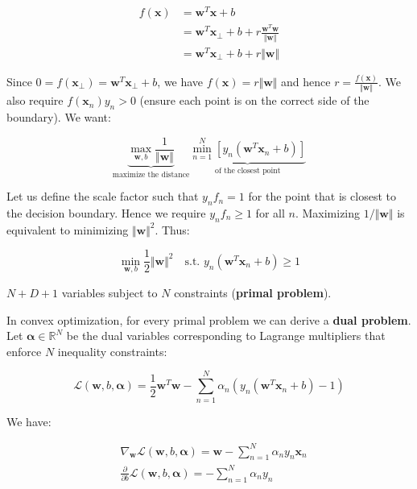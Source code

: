 \documentclass[10pt,landscape]{article}
\begin{document}
\begin{multicols}{3}
\begin{align*}
f(\mathbf{x}) & = \mathbf{w}^{T}\mathbf{x} + b \\
& = \mathbf{w}^{T}\mathbf{x}_{\bot}+b+r\frac{\mathbf{w}^{T}\mathbf{w}}{\Vert \mathbf{w} \Vert} \\
& = \mathbf{w}^{T}\mathbf{x}_{\bot}+b+r{\Vert \mathbf{w} \Vert}
\end{align*}

Since $0 = f(\mathbf{x}_{\bot}) = \mathbf{w}^{T}\mathbf{x}_{\bot}+b$, we have $f(\mathbf{x}) = r{\Vert \mathbf{w} \Vert}$ and hence $r=\frac{f(\mathbf{x})}{\Vert \mathbf{w} \Vert}$. We also require $f(\mathbf{x}_n)y_n > 0$ (ensure each point is on the correct side of the boundary). We want:

\begin{equation*}
\underbrace{\max_{\mathbf{w}, b} \frac{1}{\Vert \mathbf{w} \Vert}}_{\textrm{maximize the distance}} \underbrace{\min_{n=1}^{N} \left[ y_n\left( \mathbf{w}^{T}\mathbf{x}_n+b\right) \right]}_{\textrm{of the closest point}}
\end{equation*}

Let us define the scale factor such that $y_n f_n = 1$ for the point that is closest to the decision boundary. Hence we require $y_n f_n \geq 1$ for all $n$. Maximizing $1/\Vert \mathbf{w} \Vert$ is equivalent to minimizing $\Vert \mathbf{w} \Vert^2$. Thus:

\begin{equation*}
\boxed{\min_{\mathbf{w}, b}\frac{1}{2}\Vert \mathbf{w} \Vert^2 \quad \textrm{s.t. } y_n\left( \mathbf{w}^{T}\mathbf{x}_n + b \right) \geq 1}
\end{equation*}

$N+D+1$ variables subject to $N$ constraints (\textbf{primal problem}).

In convex optimization, for every primal problem we can derive a \textbf{dual problem}. Let $\mathbf{\alpha} \in \mathbb{R}^N$ be the dual variables corresponding to Lagrange multipliers that enforce $N$ inequality constraints:

\begin{equation*}
\mathcal{L}\left( \mathbf{w}, b, \mathbf{\alpha}\right) = \frac{1}{2}\mathbf{w}^T\mathbf{w}-\sum_{n=1}^N \alpha_n \left( y_n \left( \mathbf{w}^{T}\mathbf{x}_n + b \right) - 1 \right)
\end{equation*}

We have:

\begin{align*}
& \nabla_{\mathbf{w}} \mathcal{L}\left( \mathbf{w}, b, \mathbf{\alpha}\right) = \mathbf{w} - \sum_{n=1}^N \alpha_n y_n\mathbf{x}_n \\
& \frac{\partial}{\partial b} \mathcal{L}\left( \mathbf{w}, b, \mathbf{\alpha}\right) = - \sum_{n=1}^N \alpha_n y_n
\end{align*}


\end{multicols}
\end{document}
